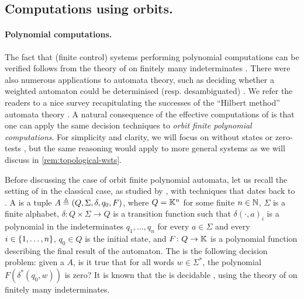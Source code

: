 



\subsection{Computations using orbits.}
\paragraph{Polynomial computations.} \AP The fact that (finite control) systems
performing polynomial computations can be verified follows from the theory of
 on finitely many indeterminates \cite{MULSEI02,BEDUSHWO17}.
There were also numerous applications to automata theory, such as deciding
whether a weighted automaton could be determinised (resp. desambiguated)
\cite{BESM23,PUSM24}. We refer the readers to a nice survey recapitulating the
successes of the ``Hilbert method'' automata theory \cite{BOJAN19}. A natural
consequence of the effective computations of  is
that one can apply the same decision techniques to \emph{orbit finite
polynomial computations}. For simplicity and clarity, we will focus on
 without states or zero-tests \cite{BEDUSHWO17}, but
the same reasoning would apply to more general systems as we will discuss in
\cref{rem:topological-wsts}.


\AP Before discussing the case of orbit finite polynomial automata, let us
recall the setting of  in the classical case, as
studied by \cite{BEDUSHWO17}, with techniques that dates back to
\cite{MULSEI02}. A  is a tuple $A \triangleq (Q,
\Sigma, \delta, q_0, F)$, where $Q = \mathbb{K}^n$ for some finite $n \in \mathbb{N}$, $\Sigma$
is a finite alphabet, $\delta \colon Q \times \Sigma \to Q$ is a transition
function such that $\delta(\cdot,a)_i$ is a polynomial in the indeterminates
$q_1, \dots, q_n$ for every $a \in \Sigma$ and every $i \in \{ 1, \dots, n \}$,
$q_0 \in Q$ is the initial state, and $F \colon Q \to \mathbb{K}$ is a polynomial
function describing the final result of the automaton. The  is the following decision problem: given a
 $A$, is it true that for all words $w \in \Sigma^*$,
the polynomial $F(\delta^*(q_0, w))$ is zero? It is known that the  is decidable \cite{BEDUSHWO17}, using the
theory of  on finitely many indeterminates. 

